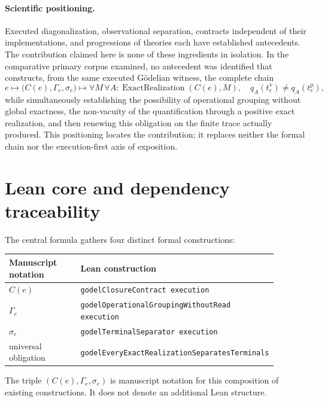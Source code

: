 \documentclass[11pt,a4paper]{article}
\newcommand{\ExactRealization}{\operatorname{ExactRealization}}
\newcommand{\code}[1]{\nolinkurl{#1}}
\theoremstyle{remark}
\begin{document}
\paragraph{Scientific positioning.}
Executed diagonalization, observational separation, contracts independent
of their implementations, and progressions of theories each have
established antecedents. The contribution claimed here is none of these
ingredients in isolation. In the comparative primary corpus examined, no
antecedent was identified that constructs, from the same executed Gödelian
witness, the complete chain
\[
e\longmapsto\bigl(C(e),\Gamma_e,\sigma_e\bigr)
\longmapsto
\forall M\,\forall A:\ExactRealization(C(e),M),\quad
q_A(t_e^{\mathrm v})\neq q_A(t_e^{\mathrm p}),
\]
while simultaneously establishing the possibility of operational grouping
without global exactness, the non-vacuity of the quantification through a
positive exact realization, and then renewing this obligation on the finite
trace actually produced. This positioning locates the contribution; it
replaces neither the formal chain nor the execution-first axis of exposition.

\section{Lean core and dependency traceability}
\label{sec:lean}

The central formula gathers four distinct formal constructions:
\begin{center}
\renewcommand{\arraystretch}{1.2}
\begin{tabular}{>{\raggedright\arraybackslash}p{0.28\linewidth}
                >{\raggedright\arraybackslash}p{0.61\linewidth}}
\toprule
\textbf{Manuscript notation} & \textbf{Lean construction} \\
\midrule
$C(e)$ & \code{godelClosureContract execution} \\
$\Gamma_e$ & \code{godelOperationalGroupingWithoutRead execution} \\
$\sigma_e$ & \code{godelTerminalSeparator execution} \\
universal obligation & \code{godelEveryExactRealizationSeparatesTerminals} \\
\bottomrule
\end{tabular}
\end{center}

The triple $(C(e),\Gamma_e,\sigma_e)$ is manuscript notation for this
composition of existing constructions. It does not denote an additional
Lean structure.
\end{document}
